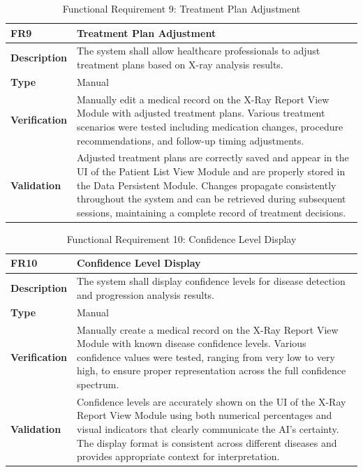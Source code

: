 \documentclass[12pt, titlepage]{article}
\begin{document}
\begin{table}[h!]
\centering
{}
\begin{tabular}{|p{3.5cm}|p{11.5cm}|}
\hline
\rowcolor{gray!30}
\textbf{FR9} & \textbf{Treatment Plan Adjustment} \\
\hline
\textbf{Description} & The system shall allow healthcare professionals to adjust treatment plans based on X-ray analysis results. \\
\hline
\textbf{Type} & Manual \\
\hline
\textbf{Verification} & Manually edit a medical record on the X-Ray Report View Module with adjusted treatment plans. Various treatment scenarios were tested including medication changes, procedure recommendations, and follow-up timing adjustments. \\
\hline
\textbf{Validation} & Adjusted treatment plans are correctly saved and appear in the UI of the Patient List View Module and are properly stored in the Data Persistent Module. Changes propagate consistently throughout the system and can be retrieved during subsequent sessions, maintaining a complete record of treatment decisions. \\
\hline
\end{tabular}
\caption{Functional Requirement 9: Treatment Plan Adjustment}
\end{table}

\begin{table}[h!]
\centering
{}
\begin{tabular}{|p{3.5cm}|p{11.5cm}|}
\hline
\rowcolor{gray!30}
\textbf{FR10} & \textbf{Confidence Level Display} \\
\hline
\textbf{Description} & The system shall display confidence levels for disease detection and progression analysis results. \\
\hline
\textbf{Type} & Manual \\
\hline
\textbf{Verification} & Manually create a medical record on the X-Ray Report View Module with known disease confidence levels. Various confidence values were tested, ranging from very low to very high, to ensure proper representation across the full confidence spectrum. \\
\hline
\textbf{Validation} & Confidence levels are accurately shown on the UI of the X-Ray Report View Module using both numerical percentages and visual indicators that clearly communicate the AI's certainty. The display format is consistent across different diseases and provides appropriate context for interpretation. \\
\hline
\end{tabular}
\caption{Functional Requirement 10: Confidence Level Display}
\end{table}
\end{document}
